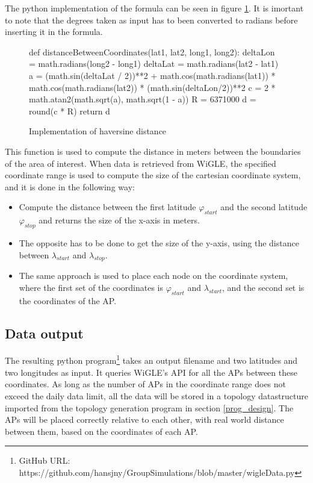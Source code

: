 The python implementation of the formula can be seen in figure \ref{fig:haversine}. It is imortant to note that the degrees taken as input
has to been converted to radians before inserting it in the formula. 

	\begin{figure}[H]
		\tiny
		\begin{python}
def distanceBetweenCoordinates(lat1, lat2, long1, long2):
	deltaLon = math.radians(long2 - long1)
	deltaLat = math.radians(lat2 - lat1)
	a = (math.sin(deltaLat / 2))**2 + math.cos(math.radians(lat1)) * math.cos(math.radians(lat2)) * (math.sin(deltaLon/2))**2
	c = 2 * math.atan2(math.sqrt(a), math.sqrt(1 - a)) 
	R = 6371000
	d = round(c * R)
	return d
	\end{python}
			\caption{Implementation of haversine distance}
			\label{fig:haversine}
	\end{figure}


This function is used to compute the distance in meters between the boundaries of the area of interest. When data is retrieved from
WiGLE, the specified coordinate range is used to compute the size of the cartesian coordinate system, and it is done in the following way:
\begin{itemize}
	\item Compute the distance between the first latitude $\varphi_{start}$ and the second latitude $\varphi_{stop}$ and returns the size of the x-axis in meters.
	\item The opposite has to be done to get the size of the y-axis, using the distance between $\lambda_{start}$ and $\lambda_{stop}$. 
	\item The same approach is used to place each node on the coordinate system, where the first set of the coordinates is
$\varphi_{start}$ and $\lambda_{start}$, and the second set is the coordinates of the AP.

\end{itemize}
\subsection{Data output}
The resulting python program\footnote{GitHub URL: https://github.com/hansjny/GroupSimulations/blob/master/wigleData.py} takes an output filename and two latitudes and two longitudes as input.
It queries WiGLE's API for all the APs between these coordinates. As long as the number of APs in the coordinate range does not exceed the daily data limit, all the data will be stored in a topology datastructure imported 
from the topology generation program in section \ref{prog_design}. The APs will be placed correctly relative to each other, with real world distance between them,
based on the coordinates of each AP. 


